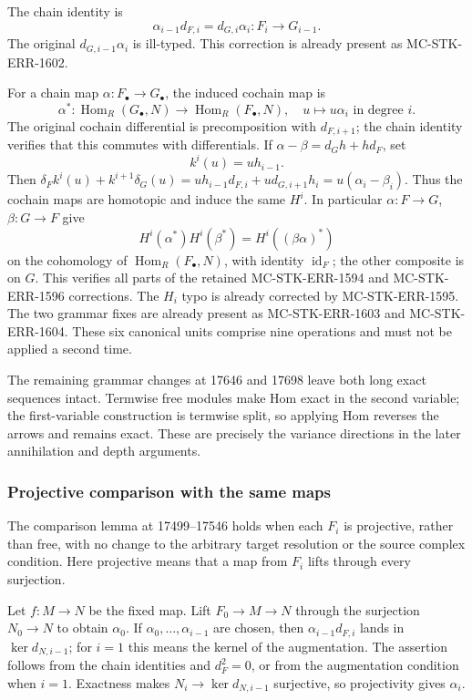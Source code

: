 The chain identity is \[
\alpha_{i-1}d_{F,i}=d_{G,i}\alpha_i:F_i\longrightarrow G_{i-1}.
\] The original \(d_{G,i-1}\alpha_i\) is ill-typed. This correction is already present as MC-STK-ERR-1602.

For a chain map \(\alpha:F_\bullet\to G_\bullet\), the induced cochain map is \[
\alpha^*:\operatorname{Hom}_R(G_\bullet,N)
\longrightarrow\operatorname{Hom}_R(F_\bullet,N),\quad
u\longmapsto u\alpha_i\text{ in degree }i.
\] The original cochain differential is precomposition with \(d_{F,i+1}\); the chain identity verifies that this commutes with differentials. If \(\alpha-\beta=d_Gh+hd_F\), set \[
k^i(u)=u h_{i-1}.
\] Then \(\delta_F k^i(u)+k^{i+1}\delta_G(u)
=u h_{i-1}d_{F,i}+u d_{G,i+1}h_i=u(\alpha_i-\beta_i)\). Thus the cochain maps are homotopic and induce the same \(H^i\). In particular \(\alpha:F\to G\), \(\beta:G\to F\) give \[
H^i(\alpha^*)H^i(\beta^*)=H^i((\beta\alpha)^*)
\] on the cohomology of \(\operatorname{Hom}_R(F_\bullet,N)\), with identity \(\operatorname{id}_F\); the other composite is on \(G\). This verifies all parts of the retained MC-STK-ERR-1594 and MC-STK-ERR-1596 corrections. The \(H_i\) typo is already corrected by MC-STK-ERR-1595. The two grammar fixes are already present as MC-STK-ERR-1603 and MC-STK-ERR-1604. These six canonical units comprise nine operations and must not be applied a second time.

The remaining grammar changes at 17646 and 17698 leave both long exact sequences intact. Termwise free modules make Hom exact in the second variable; the first-variable construction is termwise split, so applying Hom reverses the arrows and remains exact. These are precisely the variance directions in the later annihilation and depth arguments.

\subsubsection{Projective comparison with the same maps}\label{projective-comparison-with-the-same-maps}

The comparison lemma at 17499--17546 holds when each \(F_i\) is projective, rather than free, with no change to the arbitrary target resolution or the source complex condition. Here projective means that a map from \(F_i\) lifts through every surjection.

Let \(f:M\to N\) be the fixed map. Lift \(F_0\to M\to N\) through the surjection \(N_0\to N\) to obtain \(\alpha_0\). If \(\alpha_0,\ldots,\alpha_{i-1}\) are chosen, then \(\alpha_{i-1}d_{F,i}\) lands in \(\ker d_{N,i-1}\); for \(i=1\) this means the kernel of the augmentation. The assertion follows from the chain identities and \(d_F^2=0\), or from the augmentation condition when \(i=1\). Exactness makes \(N_i\to\ker d_{N,i-1}\) surjective, so projectivity gives \(\alpha_i\).

